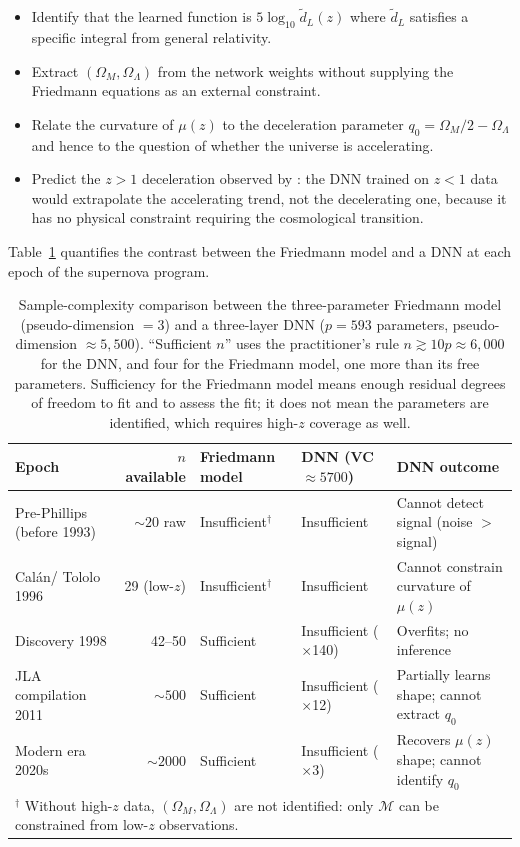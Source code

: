\documentclass[12pt]{article}
\begin{document}
\begin{itemize}
  \item Identify that the learned function is $5\log_{10}\tilde d_L(z)$
    where $\tilde d_L$ satisfies a specific integral from general
    relativity.
  \item Extract $(\Omega_M, \Omega_\Lambda)$ from the network weights
    without supplying the Friedmann equations as an external constraint.
  \item Relate the curvature of $\mu(z)$ to the deceleration parameter
    $q_0 = \Omega_M/2 - \Omega_\Lambda$ and hence to the question
    of whether the universe is accelerating.
  \item Predict the $z > 1$ deceleration observed by \citet{Riess2004}:
    the DNN trained on $z < 1$ data would extrapolate the
    accelerating trend, not the decelerating one, because it has no
    physical constraint requiring the cosmological transition.
\end{itemize}

Table~\ref{tab:sample_complexity} quantifies the contrast between the
Friedmann model and a DNN at each epoch of the supernova program.

\begin{table}[ht]
\centering
\caption{Sample-complexity comparison between the three-parameter
Friedmann model (pseudo-dimension $= 3$) and a three-layer DNN
($p = 593$ parameters, pseudo-dimension $\approx 5{,}500$).  ``Sufficient
$n$'' uses the practitioner's rule $n \gtrsim 10p \approx 6{,}000$ for the
DNN, and four for the Friedmann model, one more than its free parameters.
Sufficiency for the Friedmann model means enough residual degrees of freedom
to fit and to assess the fit; it does not mean the parameters are identified,
which requires high-$z$ coverage as well.}
\label{tab:sample_complexity}
\begin{tabular}{p{2.6cm}rp{2.4cm}p{2.4cm}p{3.8cm}}
\toprule
Epoch & $n$ available & Friedmann model & DNN
  (VC$\approx 5700$) & DNN outcome \\
\midrule
Pre-Phillips (before 1993) & $\sim 20$ raw & Insufficient$^\dagger$
  & Insufficient & Cannot detect signal (noise $> $ signal) \\
Cal\'an/ Tololo 1996 & 29 (low-$z$) & Insufficient$^\dagger$
  & Insufficient & Cannot constrain curvature of $\mu(z)$ \\
Discovery 1998 & 42--50 & Sufficient
  & Insufficient ($\times$140) & Overfits; no inference \\
JLA compilation 2011 & $\sim 500$ & Sufficient
  & Insufficient ($\times$12) & Partially learns shape; cannot extract $q_0$ \\
Modern era 2020s & $\sim 2000$ & Sufficient
  & Insufficient ($\times$3) & Recovers $\mu(z)$ shape; cannot identify $q_0$ \\
\bottomrule
\multicolumn{5}{p{14cm}}{$^\dagger$ Without high-$z$ data, $(\Omega_M,
  \Omega_\Lambda)$ are not identified: only $\mathcal{M}$ can be
  constrained from low-$z$ observations.}
\end{tabular}
\end{table}
\end{document}

